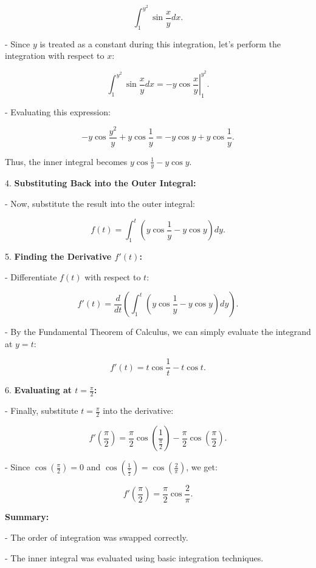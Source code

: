 \documentclass[a4paper,12pt]{book}
\begin{document}
     \[
     \int_1^{y^2} \sin{\frac{x}{y}} dx.
     \]
     
   - Since \(y\) is treated as a constant during this integration, let’s perform the integration with respect to \(x\):
   
     \[
     \int_1^{y^2} \sin{\frac{x}{y}} dx = \left. -y \cos{\frac{x}{y}} \right|_{1}^{y^2}.
     \]
     
   - Evaluating this expression:
   
     \[
     -y \cos{\frac{y^2}{y}} + y \cos{\frac{1}{y}} = -y \cos{y} + y \cos{\frac{1}{y}}.
     \]

   Thus, the inner integral becomes \(y \cos{\frac{1}{y}} - y \cos{y}\).

4. \textbf{Substituting Back into the Outer Integral:}

   - Now, substitute the result into the outer integral:
   
     \[
     f(t) = \int_1^t (y \cos{\frac{1}{y}} - y \cos{y}) dy.
     \]

5. \textbf{Finding the Derivative \(f'(t)\):}

   - Differentiate \(f(t)\) with respect to \(t\):
   
     \[
     f'(t) = \frac{d}{dt} \left( \int_1^t (y \cos{\frac{1}{y}} - y \cos{y}) dy \right).
     \]
     
   - By the Fundamental Theorem of Calculus, we can simply evaluate the integrand at \(y = t\):
   
     \[
     f'(t) = t \cos{\frac{1}{t}} - t \cos{t}.
     \]

6. \textbf{Evaluating at \(t = \frac{\pi}{2}\):}

   - Finally, substitute \(t = \frac{\pi}{2}\) into the derivative:
   
     \[
     f' \left( \frac{\pi}{2} \right) = \frac{\pi}{2} \cos{\left(\frac{1}{\frac{\pi}{2}}\right)} - \frac{\pi}{2} \cos{\left(\frac{\pi}{2}\right)}.
     \]
     
   - Since \(\cos{\left(\frac{\pi}{2}\right)} = 0\) and \(\cos{\left(\frac{1}{\frac{\pi}{2}}\right)} = \cos{\left(\frac{2}{\pi}\right)}\), we get:
   
     \[
     f' \left( \frac{\pi}{2} \right) = \frac{\pi}{2} \cos{\frac{2}{\pi}}.
     \]

\textbf{Summary:}

- The order of integration was swapped correctly.

- The inner integral was evaluated using basic integration techniques.
\end{document}
